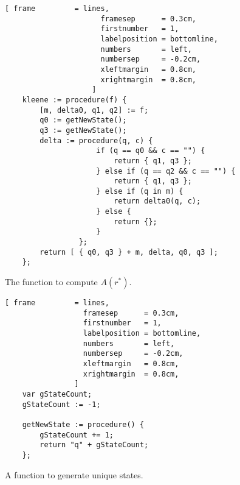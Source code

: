 \begin{enumerate}
    \begin{figure}[!ht]
    \centering
    \begin{Verbatim}[ frame         = lines, 
                      framesep      = 0.3cm, 
                      firstnumber   = 1,
                      labelposition = bottomline,
                      numbers       = left,
                      numbersep     = -0.2cm,
                      xleftmargin   = 0.8cm,
                      xrightmargin  = 0.8cm,
                    ]
    kleene := procedure(f) {
        [m, delta0, q1, q2] := f;
        q0 := getNewState(); 
        q3 := getNewState(); 
        delta := procedure(q, c) {
                     if (q == q0 && c == "") {
                         return { q1, q3 };
                     } else if (q == q2 && c == "") {
                         return { q1, q3 };
                     } else if (q in m) {
                         return delta0(q, c);
                     } else {
                         return {};
                     } 
                 };
        return [ { q0, q3 } + m, delta, q0, q3 ];
    };
    \end{Verbatim}
    \vspace*{-0.3cm}
    \caption{The function to compute $A(r^*)$.}
    \label{fig:kleene.stlx}
    \end{figure}
\end{enumerate}

\begin{figure}[!ht]
\centering
\begin{Verbatim}[ frame         = lines, 
                  framesep      = 0.3cm, 
                  firstnumber   = 1,
                  labelposition = bottomline,
                  numbers       = left,
                  numbersep     = -0.2cm,
                  xleftmargin   = 0.8cm,
                  xrightmargin  = 0.8cm,
                ]
    var gStateCount;
    gStateCount := -1;
    
    getNewState := procedure() {
        gStateCount += 1;
        return "q" + gStateCount;
    };
\end{Verbatim}
\vspace*{-0.3cm}
\caption{A function to generate unique states.}
\label{fig:getNewState.stlx}
\end{figure}

